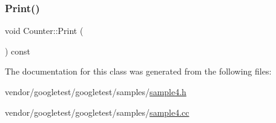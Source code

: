 \mbox{\label{class_counter_a80092ec2a0deea0870b2e9f8ad0906bd}} 
\subsubsection{\texorpdfstring{Print()}{Print()}}
{\footnotesize\ttfamily void Counter\+::\+Print (\begin{DoxyParamCaption}{ }\end{DoxyParamCaption}) const}



The documentation for this class was generated from the following files\+:\begin{DoxyCompactItemize}
\item 
vendor/googletest/googletest/samples/\hyperlink{sample4_8h}{sample4.\+h}\item 
vendor/googletest/googletest/samples/\hyperlink{sample4_8cc}{sample4.\+cc}\end{DoxyCompactItemize}
